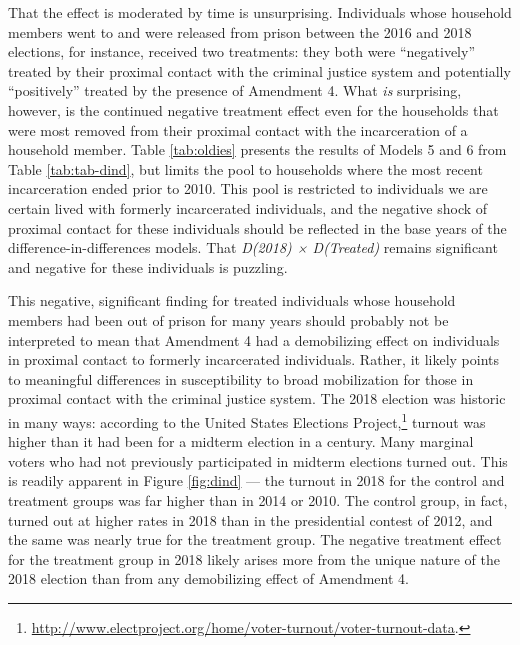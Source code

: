 \documentclass[
  12pt,
]{article}
\begin{document}
That the effect is moderated by time is unsurprising. Individuals whose household members went to and were released from prison between the 2016 and 2018 elections, for instance, received two treatments: they both were ``negatively'' treated by their proximal contact with the criminal justice system and potentially ``positively'' treated by the presence of Amendment 4. What \emph{is} surprising, however, is the continued negative treatment effect even for the households that were most removed from their proximal contact with the incarceration of a household member. Table \ref{tab:oldies} presents the results of Models 5 and 6 from Table \ref{tab:tab-dind}, but limits the pool to households where the most recent incarceration ended prior to 2010. This pool is restricted to individuals we are certain lived with formerly incarcerated individuals, and the negative shock of proximal contact for these individuals should be reflected in the base years of the difference-in-differences models. That \emph{D(2018) × D(Treated)} remains significant and negative for these individuals is puzzling.

\begin{singlespace}

\end{singlespace}

This negative, significant finding for treated individuals whose household members had been out of prison for many years should probably not be interpreted to mean that Amendment 4 had a demobilizing effect on individuals in proximal contact to formerly incarcerated individuals. Rather, it likely points to meaningful differences in susceptibility to broad mobilization for those in proximal contact with the criminal justice system. The 2018 election was historic in many ways: according to the United States Elections Project,\footnote{\url{http://www.electproject.org/home/voter-turnout/voter-turnout-data}.} turnout was higher than it had been for a midterm election in a century. Many marginal voters who had not previously participated in midterm elections turned out. This is readily apparent in Figure \ref{fig:dind} --- the turnout in 2018 for the control and treatment groups was far higher than in 2014 or 2010. The control group, in fact, turned out at higher rates in 2018 than in the presidential contest of 2012, and the same was nearly true for the treatment group. The negative treatment effect for the treatment group in 2018 likely arises more from the unique nature of the 2018 election than from any demobilizing effect of Amendment 4.
\end{document}
